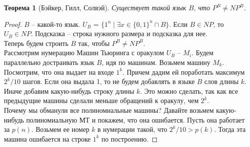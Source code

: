 \documentclass[12pt, letterpaper]{article}
\newtheorem{theorem}{Теорема}[section]
\begin{document}
\begin{theorem}[Бэйкер, Гилл, Солвэй]
Существует такой язык $B$, что $P^B \neq NP^B$.
\end{theorem}
\begin{proof}
$B$ -- какой-то язык. $U_B$ = $\{1^n\;|\;\exists x \in \{0,1\}^n \cap B \}$. Если $B \in NP$, то $U_B \in NP$. Подсказка -- строка нужного размера и подсказка для нее.\\
Теперь будем строить $B$ так, чтобы $P^B \neq NP^B$.\\
Рассмотрим нумерацию Машин Тьюринга с оракулом $U_B$ -- $M_i$. Будем параллельно достраивать язык $B$, идя по машинам. Возьмем машину $M_k$. Посмотрим, что она выдает на входе $1^k$. Причем дадим ей поработать максимум $2^k/10$ шагов. Если она выдала 1, то не будем добавлять в языке $B$ слов длины $k$. Иначе добавим какую-нибудь строку длины $k$. Это можно сделать, так как все предыдущие машины сделали меньше обращений к оракулу, чем $2^k$. \\
Почему мы обманули все полиномиальные машины? Давайте возьмем какую-нибудь полиномиальную МТ и покажем, что она ошибается. Пусть она работает за $p(n)$. Возьмем ее номер $k$ в нумерации такой, что $2^k / 10 > p(k)$. Тогда эта машина ошибается на строке $1^k$ по построению.
\end{proof}
\end{document}
